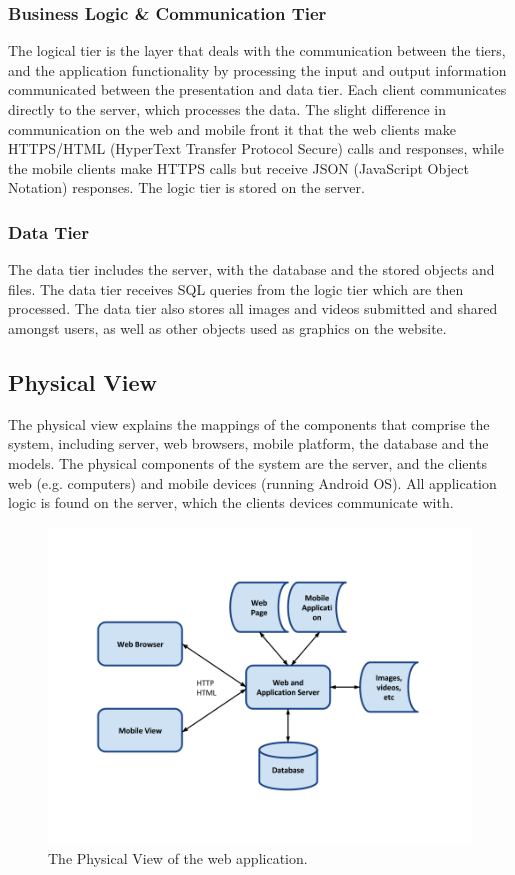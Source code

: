 \subsubsection{Business Logic \& Communication Tier}
The logical tier is the layer that deals with the communication between the tiers, and the application functionality by processing the input and output information communicated between the presentation and data tier. Each client communicates directly to the server, which processes the data. The slight difference in communication on the web and mobile front it that the web clients make HTTPS/HTML (HyperText Transfer Protocol Secure) calls and responses, while the mobile clients make HTTPS calls but receive JSON (JavaScript Object Notation) responses. The logic tier is stored on the server. 

\subsubsection{Data Tier}
The data tier includes the server, with the database and the stored objects and files. The data tier receives SQL queries from the logic tier which are then processed. The data tier also stores all images and videos submitted and shared amongst users, as well as other objects used as graphics on the website. 

\subsection{Physical View}
\label{subsec:ArchViewsPhysical}
The physical view explains the mappings of the components that comprise the system, including server, web browsers, mobile platform, the database and the models. The physical components of the system are the server, and the clients web (e.g. computers) and mobile devices (running Android OS). All application logic is found on the server, which the clients devices communicate with.

\begin{figure}
\centering
\includegraphics[width=\linewidth]{./Architecture/img/PhysicalView.png}
\caption{The Physical View of the web application. \label{overflow}}
\end{figure}

